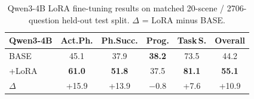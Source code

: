 \begin{table}[t]
  \centering
  \caption{Qwen3-4B LoRA fine-tuning results on matched 20-scene / 2706-question
  held-out test split. $\Delta$ = LoRA minus BASE.}
  \label{tab:lora_results}
  \setlength{\tabcolsep}{4pt}
  \begin{tabular}{l|cccc|c}
    \toprule
    \textbf{Qwen3-4B} & \textbf{Act.Ph.} & \textbf{Ph.Succ.} & \textbf{Prog.} & \textbf{Task\,S.} & \textbf{Overall} \\
    \midrule
    BASE    & 45.1          & 37.9          & \textbf{38.2} & 73.5          & 44.2 \\
    +LoRA   & \textbf{61.0} & \textbf{51.8} & 37.5          & \textbf{81.1} & \textbf{55.1} \\
    \midrule
    $\Delta$ & +15.9        & +13.9         & $-$0.8        & +7.6          & +10.9 \\
    \bottomrule
  \end{tabular}
\end{table}

